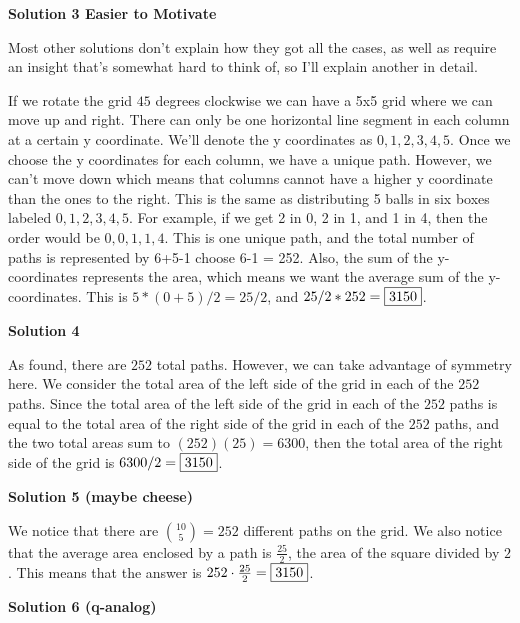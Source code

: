 \begin{enumerate}
 



\textbf{Solution 3 Easier to Motivate}

Most other solutions don't explain how they got all the cases, as well as require an insight that's somewhat hard to think of, so I'll explain another in detail. 

 If we rotate the grid $45$ degrees clockwise we can have a 5x5 grid where we can move up and right. There can only be one horizontal line segment in each column at a certain y coordinate. We'll denote the y coordinates as $0,1,2,3,4,5$. Once we choose the y coordinates for each column, we have a unique path. However, we can't move down which means that columns cannot have a higher y coordinate than the ones to the right. This is the same as distributing 5 balls in six boxes labeled $0,1,2,3,4,5$. For example, if we get 2 in 0, 2 in 1, and 1 in 4, then the order would be $0,0,1,1,4$. This is one unique path, and the total number of paths is represented by 6+5-1 choose 6-1 = 252. Also, the sum of the y-coordinates represents the area, which means we want the average sum of the y-coordinates. This is $5*(0+5)/2 = 25/2$, and $25/2 * 252 = \fbox{3150}$.

 



\textbf{Solution 4}

As found, there are $252$ total paths. However, we can take advantage of symmetry here. We consider the total area of the left side of the grid in each of the $252$ paths. Since the total area of the left side of the grid in each of the $252$ paths is equal to the total area of the right side of the grid in each of the $252$ paths, and the two total areas sum to $(252)(25) = 6300$, then the total area of the right side of the grid is $6300/2 = \fbox{3150}$.

 



\textbf{Solution 5 (maybe cheese)}

We notice that there are $\binom{10}{5} = 252$ different paths on the grid. We also notice that the average area enclosed  by a path is $\frac{25}{2}$, the area of the square divided by $2$. This means that the answer is $252 \cdot \frac{25}{2} = \fbox{3150}$.

 



\textbf{Solution 6 (q-analog)}


\end{enumerate}
